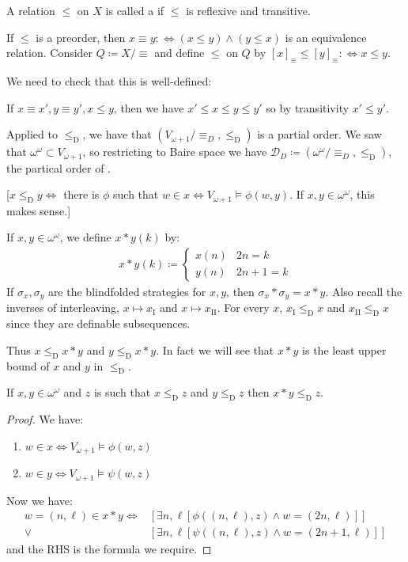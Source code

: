 \documentclass[]{article}
\newcommand{\I}{\textrm{I}}
\newcommand{\II}{\textrm{II}}
\newcommand{\om}{\omega}
\newcommand{\led}{\le_{\mathrm{D}}}
\begin{document}
\begin{defin*}[Preorder]
    A relation $\le$ on $X$ is called a  if $\le$ is reflexive and transitive.

    If $\le$ is a preorder, then $x \equiv y :\iff (x\le y)\land (y\le x)$ is an equivalence relation. Consider $Q \coloneqq X/\equiv$ and define $\le$ on $Q$ by $[x]_\equiv \le [y]_\equiv :\iff x\le y$.

    We need to check that this is well-defined:

    If $x\equiv x',y\equiv y',x\le y$, then we have $x'\le x \le y\le y'$ so by transitivity $x'\le y'$.
\end{defin*}


Applied to $\led$, we have that $(V_{\om+1}/\equiv_D,\led)$ is a partial order. We saw that $\om^\om \subset V_{\om+1}$, so restricting to Baire space we have $\mathcal{D}_D \coloneqq (\om^\om/\equiv_D,\led)$, the partical order of .

[$x\led y \iff $ there is $\phi$ such that $w\in x\iff V_{\om+1}\models \phi(w,y)$. If $x,y\in\om^\om$, this makes sense.]

If $x,y\in\om^\om$, we define $x\ast y(k)$ by:
\begin{align*}
    x\ast y(k)\coloneqq \left\lbrace \begin{array}{cl}x(n) & 2n = k\\ y(n) & 2n+1 = k \end{array}\right.
\end{align*}
If $\sigma_x,\sigma_y$ are the blindfolded strategies for $x,y$, then $\sigma_x\ast \sigma_y = x\ast y$. Also recall the inverses of interleaving, $x\mapsto x_\I$ and $x\mapsto x_\II$. For every $x$, $x_\I \led x$ and $x_\II \led x$ since they are definable subsequences.

Thus $x\led x\ast y$ and $y\led x\ast y$. In fact we will see that $x\ast y$ is the least upper bound of $x$ and $y$ in $\led$.

\begin{thmenv*}[Proposition]
If $x,y\in \om^\om$ and $z$ is such that $x\led z$ and $y\led z$ then $x\ast y\led z$.
\end{thmenv*}
\begin{proof}
    We have:
    \begin{enumerate}[label=(\arabic*)]
        \item $w\in x \iff V_{\om+1}\models \phi(w,z)$
        \item $w \in y \iff V_{\om+1}\models \psi(w,z)$
    \end{enumerate}
    Now we have:
    \begin{align*}
        w = (n,\ell) \in x\ast y \iff& [\exists n,\ell [\phi((n,\ell),z)\land w = (2n,\ell)]]\\
        \lor& [\exists n,\ell [\psi((n,\ell),z)\land w = (2n+1,\ell)]]
    \end{align*}
    and the RHS is the formula we require.
\end{proof}
\end{document}
